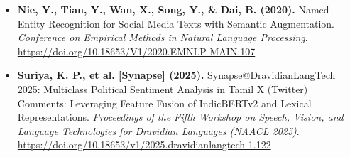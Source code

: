 \documentclass[12pt,a4paper]{article}
\begin{document}
\begin{itemize}
    \item \textbf{Nie, Y., Tian, Y., Wan, X., Song, Y., \& Dai, B. (2020).} Named Entity Recognition for Social Media Texts with Semantic Augmentation. \textit{Conference on Empirical Methods in Natural Language Processing}. \url{https://doi.org/10.18653/V1/2020.EMNLP-MAIN.107}

    \item \textbf{Suriya, K. P., et al. [Synapse] (2025).} Synapse@DravidianLangTech 2025: Multiclass Political Sentiment Analysis in Tamil X (Twitter) Comments: Leveraging Feature Fusion of IndicBERTv2 and Lexical Representations. \textit{Proceedings of the Fifth Workshop on Speech, Vision, and Language Technologies for Dravidian Languages (NAACL 2025)}. \url{https://doi.org/10.18653/v1/2025.dravidianlangtech-1.122}
\end{itemize}
\end{document}
